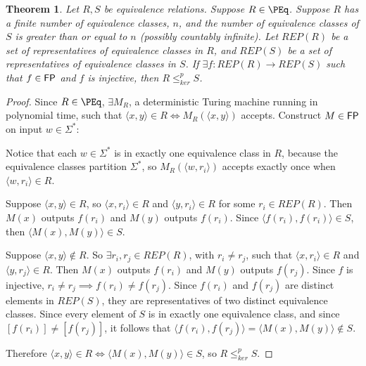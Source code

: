 \documentclass{article}
\newtheorem{theorem}{Theorem}[section]
\theoremstyle{definition} \newtheorem{definition}[definition]{Definition}
\newcommand{\sigmastar}{\Sigma^{*}} %
\newcommand{\kr}{\leq^{p}_{ker}} %
\newcommand{\pair}[2]{\langle#1,#2\rangle} %
\begin{document}
\begin{theorem}\label{thm:repr_kr}
  Let $R,S$ be equivalence relations. Suppose $R\in\PEq$. Suppose $R$ has a
  finite number of equivalence classes, $n$, and the number of equivalence
  classes of $S$ is greater than or equal to $n$ (possibly countably
  infinite). Let $REP(R)$ be a set of representatives of equivalence classes in
  $R$, and $REP(S)$ be a set of representatives of equivalence classes in $S$.
  If $\exists f\colon REP(R)\to REP(S)$ such that $f\in{\ensuremath{\mathsf{FP}}}$ and $f$ is
  injective, then $R\kr S$.
\end{theorem}
\begin{proof}
  Since $R\in\PEq$, $\exists M_R$, a deterministic Turing machine running in
  polynomial time, such that $\pair{x}{y}\in R\iff M_R(\pair{x}{y})$
  accepts. Construct $M\in{\ensuremath{\mathsf{FP}}}$ on input $w\in\sigmastar$:\\
  \begin{algorithm}[H]
    \For{$r_i\in REP(R)$}{
      \If{$M_R(\pair{w}{r_i})$ accepts}{
        \Return{$f(r_i)$}
      }
    }
  \end{algorithm}
  Notice that each $w\in\sigmastar$ is in exactly one equivalence class in $R$,
  because the equivalence classes partition $\sigmastar$, so
  $M_R(\pair{w}{r_i})$ accepts exactly once when $\pair{w}{r_i}\in R$.

  Suppose $\pair{x}{y}\in R$, so $\pair{x}{r_i}\in R$ and $\pair{y}{r_i}\in R$
  for some $r_i\in REP(R)$. Then $M(x)$ outputs $f(r_i)$ and $M(y)$ outputs
  $f(r_i)$. Since $\pair{f(r_i)}{f(r_i)}\in S$, then $\pair{M(x)}{M(y)}\in S$.

  Suppose $\pair{x}{y}\notin R$. So $\exists r_i, r_j\in REP(R)$, with $r_i\neq
  r_j$, such that $\pair{x}{r_i}\in R$ and $\pair{y}{r_j}\in R$. Then $M(x)$
  outputs $f(r_i)$ and $M(y)$ outputs $f(r_j)$. Since $f$ is injective,
  $r_i\neq r_j\implies f(r_i)\neq f(r_j)$. Since $f(r_i)$ and $f(r_j)$ are
  distinct elements in $REP(S)$, they are representatives of two distinct
  equivalence classes. Since every element of $S$ is in exactly one equivalence
  class, and since $[f(r_i)]\neq[f(r_j)]$, it follows that
  $\pair{f(r_i)}{f(r_j)}=\pair{M(x)}{M(y)}\notin S$.

  Therefore $\pair{x}{y}\in R\iff \pair{M(x)}{M(y)}\in S$, so $R\kr S$.
\end{proof}
\end{document}
